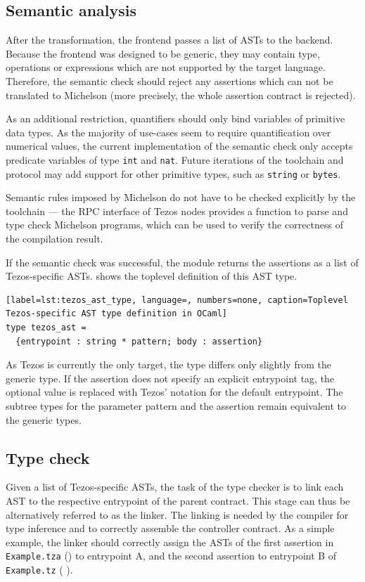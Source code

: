 \subsection{Semantic analysis}
After the transformation, the frontend passes a list of ASTs to the backend. Because the frontend was designed to be generic, they may contain type, operations or expressions which are not supported by the target language. Therefore, the semantic check should reject any assertions which can not be translated to Michelson (more precisely, the whole assertion contract is rejected).

As an additional restriction, quantifiers should only bind variables of primitive data types. As the majority of use-cases seem to require quantification over numerical values, the current implementation of the semantic check only accepts predicate variables of type \texttt{int} and \texttt{nat}. Future iterations of the toolchain and protocol may add support for other primitive types, such as \texttt{string} or \texttt{bytes}.

Semantic rules imposed by Michelson do not have to be checked explicitly by the toolchain --- the RPC interface of Tezos nodes provides a function to parse and type check Michelson programs, which can be used to verify the correctness of the compilation result.

If the semantic check was successful, the module returns the assertions as a list of Tezos-specific ASTs.  shows the toplevel definition of this AST type.
\begin{lstlisting}[label=lst:tezos_ast_type, language=, numbers=none, caption=Toplevel Tezos-specific AST type definition in OCaml]
type tezos_ast =
  {entrypoint : string * pattern; body : assertion}
\end{lstlisting}
As Tezos is currently the only target, the type differs only slightly from the generic type. If the assertion does not specify an explicit entrypoint tag, the optional value is replaced with Tezos' notation for the default entrypoint. The subtree types for the parameter pattern and the assertion remain equivalent to the generic types.

\subsection{Type check}\label{sec:typecheck}
Given a list of Tezos-specific ASTs, the task of the type checker is to link each AST to the respective entrypoint of the parent contract. This stage can thus be alternatively referred to as the linker. The linking is needed by the compiler for type inference and to correctly assemble the controller contract. As a simple example, the linker should correctly assign the ASTs of the first assertion in \texttt{Example.tza} () to entrypoint A, and the second assertion to entrypoint B of \texttt{Example.tz} ( ).


